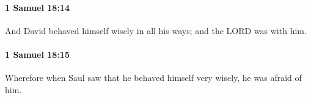 		\paragraph{1 Samuel 18:14} %
			\label{1SAMUEL-18-14}

			And David behaved himself wisely in all his ways; and the LORD was with him.


		\paragraph{1 Samuel 18:15} %
			\label{1SAMUEL-18-15}

			Wherefore when Saul saw that he behaved himself very wisely, he was afraid of him.


